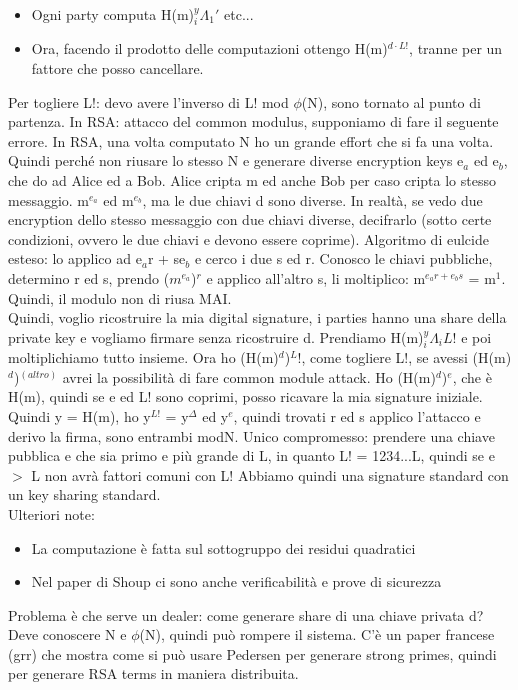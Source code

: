 \documentclass[16px]{article}
\begin{document}
\begin{itemize}
\item Ogni party computa H(m)$^y_i\Lambda_1'$ etc...
\item Ora, facendo il prodotto delle computazioni ottengo H(m)$^{d\cdot L!}$, tranne per un fattore che posso cancellare.
\end{itemize}
Per togliere L!: devo avere l'inverso di L! mod $\phi$(N), sono tornato al punto di partenza. In RSA: attacco del common modulus, supponiamo di fare il seguente errore. In RSA, una volta computato N ho un grande effort che si fa una volta. Quindi perché non riusare lo stesso N e generare diverse encryption keys e$_a$ ed e$_b$, che do ad Alice ed a Bob. Alice cripta m ed anche Bob per caso cripta lo stesso messaggio. m$^{e_a}$ ed m$^{e_b}$, ma le due chiavi d sono diverse. In realtà, se vedo due encryption dello stesso messaggio con due chiavi diverse, decifrarlo (sotto certe condizioni, ovvero le due chiavi e devono essere coprime). Algoritmo di eulcide esteso: lo applico ad e$_a$r + se$_b$ e cerco i due s ed r. Conosco le chiavi pubbliche, determino r ed s, prendo ($m^{e_a}$)$^r$ e applico all'altro s, li moltiplico: m$^{e_ar + e_bs}$ = m$^1$. Quindi, il modulo non di riusa MAI.\\ Quindi, voglio ricostruire la mia digital signature, i parties hanno una share della private key e vogliamo firmare senza ricostruire d. Prendiamo H(m)$^y_i\Lambda_iL!$ e poi moltiplichiamo tutto insieme. Ora ho (H(m)$^d$)$^L!$, come togliere L!, se avessi (H(m)$^d$)$^(altro)$ avrei la possibilità di fare common module attack. Ho (H(m)$^d$)$^e$, che è H(m), quindi se e ed L! sono coprimi, posso ricavare la mia signature iniziale. Quindi y = H(m), ho y$^{L!}$ = y$^{\Delta}$ ed y$^e$, quindi trovati r ed s applico l'attacco e derivo la firma, sono entrambi modN. Unico compromesso: prendere una chiave pubblica e che sia primo e più grande di L, in quanto L! = 1234...L, quindi se e $>$ L non avrà fattori comuni con L! Abbiamo quindi una signature standard con un key sharing standard.\\ Ulteriori note:
\begin{itemize}
\item La computazione è fatta sul sottogruppo dei residui quadratici
\item Nel paper di Shoup ci sono anche verificabilità e prove di sicurezza
\end{itemize}
Problema è che serve un dealer: come generare share di una chiave privata d? Deve conoscere N e $\phi$(N), quindi può rompere il sistema. C'è un paper francese (grr) che mostra come si può usare Pedersen per generare strong primes, quindi per generare RSA terms in maniera distribuita.
\end{document}
